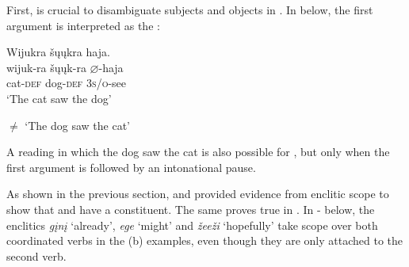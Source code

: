 \documentclass[output=paper]{LSP/langsci}
\begin{document}
First,  is crucial to disambiguate subjects and objects in .  In  below, the first argument is interpreted as the :

\begin{exe}
\ex\label{ex:jrs:31} 
\glll Wijukra	\v{s}\k{u}\k{u}kra 		haja.\\
wijuk-ra 		\v{s}\k{u}\k{u}k-ra 		$\varnothing$-haja \\
cat-\textsc{def} 		dog-\textsc{def} 	\textsc{3s/o}-see \\
\trans `The cat saw the dog'

$\neq$ `The dog saw the cat'
\end{exe}

A reading in which the dog saw the cat is also possible for , but only when the first argument is followed by an intonational pause.
	
As shown in the previous section, \citet{Boyle2007} and \citet{West2003} provided evidence from enclitic scope to show that  and  have a  constituent.  The same proves true in .  In - below, the enclitics \textit{g\k{i}n\k{i}} `already', \textit{ege} `might' and \textit{\v{z}ee\v{z}i} `hopefully' take scope over both coordinated verbs in the (b) examples, even though they are only attached to the second verb.
\end{document}
